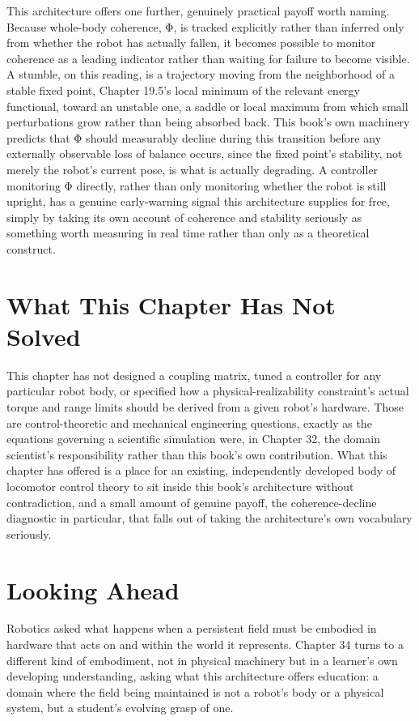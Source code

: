 This architecture offers one further, genuinely practical payoff worth naming. Because whole-body coherence, Φ, is tracked explicitly rather than inferred only from whether the robot has actually fallen, it becomes possible to monitor coherence as a leading indicator rather than waiting for failure to become visible. A stumble, on this reading, is a trajectory moving from the neighborhood of a stable fixed point, Chapter 19.5's local minimum of the relevant energy functional, toward an unstable one, a saddle or local maximum from which small perturbations grow rather than being absorbed back. This book's own machinery predicts that Φ should measurably decline during this transition before any externally observable loss of balance occurs, since the fixed point's stability, not merely the robot's current pose, is what is actually degrading. A controller monitoring Φ directly, rather than only monitoring whether the robot is still upright, has a genuine early-warning signal this architecture supplies for free, simply by taking its own account of coherence and stability seriously as something worth measuring in real time rather than only as a theoretical construct.

\section{What This Chapter Has Not Solved}

This chapter has not designed a coupling matrix, tuned a controller for any particular robot body, or specified how a physical-realizability constraint's actual torque and range limits should be derived from a given robot's hardware. Those are control-theoretic and mechanical engineering questions, exactly as the equations governing a scientific simulation were, in Chapter 32, the domain scientist's responsibility rather than this book's own contribution. What this chapter has offered is a place for an existing, independently developed body of locomotor control theory to sit inside this book's architecture without contradiction, and a small amount of genuine payoff, the coherence-decline diagnostic in particular, that falls out of taking the architecture's own vocabulary seriously.

\section{Looking Ahead}

Robotics asked what happens when a persistent field must be embodied in hardware that acts on and within the world it represents. Chapter 34 turns to a different kind of embodiment, not in physical machinery but in a learner's own developing understanding, asking what this architecture offers education: a domain where the field being maintained is not a robot's body or a physical system, but a student's evolving grasp of one.
